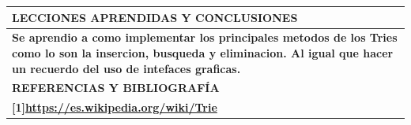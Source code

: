 \documentclass[9pt]{article}
\begin{document}
	\begin{table}[H]
		\begin{tabular}{|p{15cm}|}
			\hline 
			\rowcolor{tablebackground}
			\color{white}\textbf{LECCIONES APRENDIDAS Y CONCLUSIONES}  \\
			\hline 
			\textbf{Se aprendio a como implementar los principales metodos de los Tries
			como lo son la insercion, busqueda y eliminacion. Al igual que hacer un recuerdo del uso
			de intefaces graficas.}\\
		\hline 
		\rowcolor{tablebackground}
		\color{white}\textbf{REFERENCIAS Y BIBLIOGRAFÍA}  \\
		\hline 
		\textbf{[1]\url{https://es.wikipedia.org/wiki/Trie}}\\
		\hline 
	\end{tabular}
\end{table}
\end{document}
